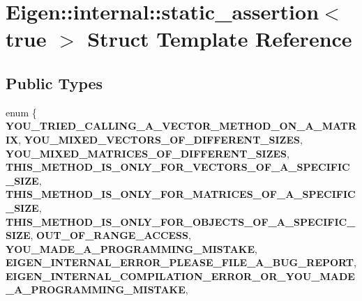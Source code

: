 \hypertarget{struct_eigen_1_1internal_1_1static__assertion_3_01true_01_4}{}\section{Eigen\+:\+:internal\+:\+:static\+\_\+assertion$<$ true $>$ Struct Template Reference}
\label{struct_eigen_1_1internal_1_1static__assertion_3_01true_01_4}
\subsection*{Public Types}
\begin{DoxyCompactItemize}
\item 
\mbox{\label{struct_eigen_1_1internal_1_1static__assertion_3_01true_01_4_abc114689e804d203ea200bf67b2d6ff3}} 
enum \{ \newline
{\bfseries Y\+O\+U\+\_\+\+T\+R\+I\+E\+D\+\_\+\+C\+A\+L\+L\+I\+N\+G\+\_\+\+A\+\_\+\+V\+E\+C\+T\+O\+R\+\_\+\+M\+E\+T\+H\+O\+D\+\_\+\+O\+N\+\_\+\+A\+\_\+\+M\+A\+T\+R\+IX}, 
{\bfseries Y\+O\+U\+\_\+\+M\+I\+X\+E\+D\+\_\+\+V\+E\+C\+T\+O\+R\+S\+\_\+\+O\+F\+\_\+\+D\+I\+F\+F\+E\+R\+E\+N\+T\+\_\+\+S\+I\+Z\+ES}, 
{\bfseries Y\+O\+U\+\_\+\+M\+I\+X\+E\+D\+\_\+\+M\+A\+T\+R\+I\+C\+E\+S\+\_\+\+O\+F\+\_\+\+D\+I\+F\+F\+E\+R\+E\+N\+T\+\_\+\+S\+I\+Z\+ES}, 
{\bfseries T\+H\+I\+S\+\_\+\+M\+E\+T\+H\+O\+D\+\_\+\+I\+S\+\_\+\+O\+N\+L\+Y\+\_\+\+F\+O\+R\+\_\+\+V\+E\+C\+T\+O\+R\+S\+\_\+\+O\+F\+\_\+\+A\+\_\+\+S\+P\+E\+C\+I\+F\+I\+C\+\_\+\+S\+I\+ZE}, 
\newline
{\bfseries T\+H\+I\+S\+\_\+\+M\+E\+T\+H\+O\+D\+\_\+\+I\+S\+\_\+\+O\+N\+L\+Y\+\_\+\+F\+O\+R\+\_\+\+M\+A\+T\+R\+I\+C\+E\+S\+\_\+\+O\+F\+\_\+\+A\+\_\+\+S\+P\+E\+C\+I\+F\+I\+C\+\_\+\+S\+I\+ZE}, 
{\bfseries T\+H\+I\+S\+\_\+\+M\+E\+T\+H\+O\+D\+\_\+\+I\+S\+\_\+\+O\+N\+L\+Y\+\_\+\+F\+O\+R\+\_\+\+O\+B\+J\+E\+C\+T\+S\+\_\+\+O\+F\+\_\+\+A\+\_\+\+S\+P\+E\+C\+I\+F\+I\+C\+\_\+\+S\+I\+ZE}, 
{\bfseries O\+U\+T\+\_\+\+O\+F\+\_\+\+R\+A\+N\+G\+E\+\_\+\+A\+C\+C\+E\+SS}, 
{\bfseries Y\+O\+U\+\_\+\+M\+A\+D\+E\+\_\+\+A\+\_\+\+P\+R\+O\+G\+R\+A\+M\+M\+I\+N\+G\+\_\+\+M\+I\+S\+T\+A\+KE}, 
\newline
{\bfseries E\+I\+G\+E\+N\+\_\+\+I\+N\+T\+E\+R\+N\+A\+L\+\_\+\+E\+R\+R\+O\+R\+\_\+\+P\+L\+E\+A\+S\+E\+\_\+\+F\+I\+L\+E\+\_\+\+A\+\_\+\+B\+U\+G\+\_\+\+R\+E\+P\+O\+RT}, 
{\bfseries E\+I\+G\+E\+N\+\_\+\+I\+N\+T\+E\+R\+N\+A\+L\+\_\+\+C\+O\+M\+P\+I\+L\+A\+T\+I\+O\+N\+\_\+\+E\+R\+R\+O\+R\+\_\+\+O\+R\+\_\+\+Y\+O\+U\+\_\+\+M\+A\+D\+E\+\_\+\+A\+\_\+\+P\+R\+O\+G\+R\+A\+M\+M\+I\+N\+G\+\_\+\+M\+I\+S\+T\+A\+KE}, 

\end{DoxyCompactItemize}
